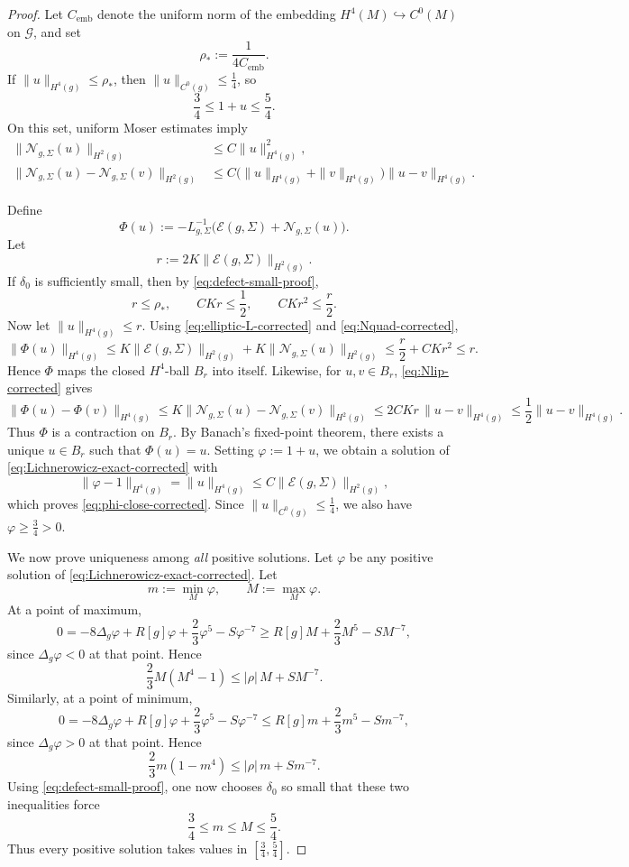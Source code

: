 \documentclass{amsart}
\begin{document}
\begin{proof}
\noindent Let \(C_{\mathrm{emb}}\) denote the uniform norm of the embedding
\(H^{4}(M)\hookrightarrow C^{0}(M)\) on \(\mathcal G\), and set
\[
\rho_{*}:=\frac{1}{4C_{\mathrm{emb}}}.
\]
If \(\|u\|_{H^{4}(g)}\le \rho_{*}\), then \(\|u\|_{C^{0}(g)}\le \frac14\), so
\[
\frac34\le 1+u\le \frac54.
\]
On this set, uniform Moser estimates imply
\begin{align}
\label{eq:Nquad-corrected}
\|\mathcal N_{g,\Sigma}(u)\|_{H^{2}(g)}
&\le
C\|u\|_{H^{4}(g)}^{2},\\
\label{eq:Nlip-corrected}
\|\mathcal N_{g,\Sigma}(u)-\mathcal N_{g,\Sigma}(v)\|_{H^{2}(g)}
&\le
C\bigl(\|u\|_{H^{4}(g)}+\|v\|_{H^{4}(g)}\bigr)\|u-v\|_{H^{4}(g)}.
\end{align}

\noindent Define
\[
\Phi(u):=
-L_{g,\Sigma}^{-1}\bigl(\mathcal E(g,\Sigma)+\mathcal N_{g,\Sigma}(u)\bigr).
\]
Let
\[
r:=2K\|\mathcal E(g,\Sigma)\|_{H^{2}(g)}.
\]
If \(\delta_{0}\) is sufficiently small, then by \eqref{eq:defect-small-proof},
\[
r\le \rho_{*},
\qquad
CKr\le \frac12,
\qquad
CKr^{2}\le \frac r2.
\]
Now let \(\|u\|_{H^{4}(g)}\le r\). Using \eqref{eq:elliptic-L-corrected} and
\eqref{eq:Nquad-corrected},
\[
\|\Phi(u)\|_{H^{4}(g)}
\le
K\|\mathcal E(g,\Sigma)\|_{H^{2}(g)}
+
K\|\mathcal N_{g,\Sigma}(u)\|_{H^{2}(g)}
\le
\frac r2+CKr^{2}
\le r.
\]
Hence \(\Phi\) maps the closed \(H^{4}\)-ball \(B_{r}\) into itself. Likewise, for
\(u,v\in B_{r}\), \eqref{eq:Nlip-corrected} gives
\[
\|\Phi(u)-\Phi(v)\|_{H^{4}(g)}
\le
K\|\mathcal N_{g,\Sigma}(u)-\mathcal N_{g,\Sigma}(v)\|_{H^{2}(g)}
\le
2CKr\,\|u-v\|_{H^{4}(g)}
\le
\frac12\|u-v\|_{H^{4}(g)}.
\]
Thus \(\Phi\) is a contraction on \(B_{r}\). By Banach's fixed-point theorem, there exists
a unique \(u\in B_{r}\) such that \(\Phi(u)=u\). Setting \(\varphi:=1+u\), we obtain a
solution of \eqref{eq:Lichnerowicz-exact-corrected} with
\[
\|\varphi-1\|_{H^{4}(g)}=\|u\|_{H^{4}(g)}
\le
C\|\mathcal E(g,\Sigma)\|_{H^{2}(g)},
\]
which proves \eqref{eq:phi-close-corrected}. Since \(\|u\|_{C^{0}(g)}\le \frac14\), we also
have \(\varphi\ge \frac34>0\).

\noindent We now prove uniqueness among \emph{all} positive solutions. Let \(\varphi\) be any
positive solution of \eqref{eq:Lichnerowicz-exact-corrected}. Let
\[
m:=\min_{M}\varphi,
\qquad
M:=\max_{M}\varphi.
\]
At a point of maximum,
\[
0
=
-8\Delta_{g}\varphi + R[g]\varphi + \frac23\varphi^{5}-S\varphi^{-7}
\ge
R[g]M+\frac23 M^{5}-S M^{-7},
\]
since $\Delta_{g} \varphi<0$ at that point.
Hence
\[
\frac23 M(M^{4}-1)\le |\rho|\,M + S M^{-7}.
\]
Similarly, at a point of minimum,
\[
0
=
-8\Delta_{g}\varphi + R[g]\varphi + \frac23\varphi^{5}-S\varphi^{-7}
\le
R[g]m+\frac23 m^{5}-S m^{-7},
\]
since $\Delta_{g} \varphi>0$ at that point.
Hence
\[
\frac23 m(1-m^{4})\le |\rho|\,m + S m^{-7}.
\]
Using \eqref{eq:defect-small-proof}, one now chooses \(\delta_{0}\) so small that these two
inequalities force
\[
\frac34\le m\le M\le \frac54.
\]
Thus every positive solution takes values in \([\frac34,\frac54]\).


\end{proof}
\end{document}
